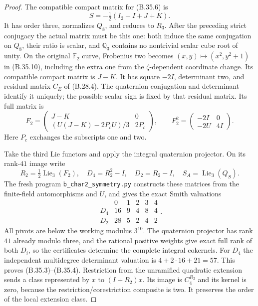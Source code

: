 \begin{proof}
The compatible compact matrix for (B.35.6) is
\[
                    S=-\tfrac12(I_2+I+J+K).                  \tag{B.35.16}
\]
It has order three, normalizes $Q_8$, and reduces to $R_3$.
After the preceding strict conjugacy the actual matrix
must be this one: both induce the same conjugation on
$Q_8$, their ratio is scalar, and $\mathbb Q_3$ contains
no nontrivial scalar cube root of unity.
On the original $\mathbb F_2$ curve, Frobenius two becomes
$(x,y)\mapsto(x^2,y^2+1)$ in (B.35.10), including the
extra one from the $\zeta$-dependent coordinate change.
Its compatible compact matrix is $J-K$.
It has square $-2I$, determinant two, and residual matrix
$C_E$ of (B.28.4). The quaternion conjugation and determinant
identify it uniquely; the possible scalar sign is fixed
by that residual matrix.
Its full matrix is
\[
 F_2=\begin{pmatrix}
 J-K&0\\(U(J-K)-2P_cU)/3&2P_c
 \end{pmatrix},\qquad
 F_2^2=\begin{pmatrix}-2I&0\\-2U&4I\end{pmatrix}.
                                                               \tag{B.35.17}
\]
Here $P_c$ exchanges the subscripts one and two.

Take the third Lie functors and apply the integral
quaternion projector. On its rank-$41$ image write
\[
 R_2=\tfrac12\operatorname{Lie}_3(F_2),\quad
 D_4=R_2^2-I,\quad D_2=R_2-I,
 \quad S_A=\operatorname{Lie}_3(Q_S).                          \tag{B.35.18}
\]
The fresh program \texttt{b\_char2\_symmetry.py} constructs
these matrices from the finite-field automorphisms and
$U$, and gives the exact Smith valuations
\[
 \begin{array}{c|rrrrr}
       &0&1&2&3&4\\ \hline
 D_4&16&9&4&8&4\\
 D_2&28&5&2&4&2
 \end{array}.                                                  \tag{B.35.19}
\]
All pivots are below the working modulus $3^{10}$.
The quaternion projector has rank $41$ already modulo
three, and the rational positive weights give exact
full rank of both $D_i$, so the certificates determine
the complete integral cokernels. For $D_4$ the independent
multidegree determinant valuation is $4+2\cdot16+21=57$.
This proves (B.35.3)--(B.35.4).
Restriction from the unramified quadratic extension
sends a class represented by $x$ to $(I+R_2)x$.
Its image is $C_4^{R_2}$ and its kernel is zero, because
the restriction/corestriction composite is two.
It preserves the order of the local extension class.


\end{proof}
